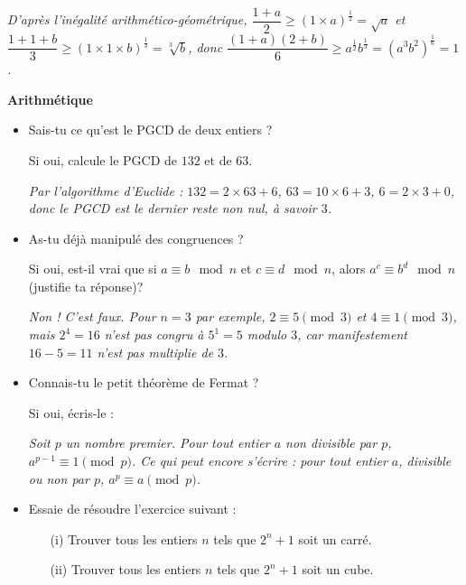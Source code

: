 \bigskip

\emph{D'après l'inégalité arithmético-géométrique, $\dfrac{1+a}{2} \geq (1 \times a)^\frac12 = \sqrt{a}$ et $\dfrac{1 + 1 + b}{3} \geq (1 \times 1 \times b)^\frac13 = \sqrt[3]{b} $, donc $\dfrac{(1+a)(2+b)}{6} \geq a^{\frac12}b^{\frac13} = \left( a^3b^2 \right) ^\frac16 = 1$.}

\bigskip



\bigskip
{\Large\textbf{Arithmétique}}
\bigskip


\begin{itemize}

\item
Sais-tu ce qu'est le PGCD de deux entiers ?  \qquad {}  \qquad {}

Si oui, calcule le PGCD de $132$ et de $63$.

\bigskip

\emph{Par l'algorithme d'Euclide : $132 = 2 \times 63 + 6$, $63 = 10 \times 6 + 3$, $6 = 2 \times 3 + 0$, donc le PGCD est le dernier reste non nul, à savoir $3$.}
\bigskip
\item
As-tu déjà manipulé des congruences ?  \qquad {}  \qquad {}

Si oui, est-il vrai que si $a \equiv b \mod n$ et $c \equiv d \mod n$, alors $a^{c} \equiv b^{d} \mod n$ (justifie ta réponse)?

\bigskip

\emph{Non ! C'est faux. Pour $n = 3$ par exemple, $2 \equiv 5 \pmod{3}$ et $4 \equiv 1 \pmod {3}$, mais $2^4 = 16$ n'est pas congru à $5^1 = 5$ modulo $3$, car manifestement $16 - 5 = 11$ n'est pas multiplie de $3$.}
\bigskip


\item Connais-tu le petit théorème de Fermat ?  \qquad {}  \qquad {}

Si oui, écris-le :

\bigskip
\emph{Soit $p$ un nombre premier. Pour tout entier $a$ non divisible par $p$, $a^{p-1} \equiv 1 \pmod{p}$. Ce qui peut encore s'écrire : pour tout entier $a$, divisible ou non par $p$, $a^p \equiv a \pmod p$.}
\bigskip
\item Essaie de résoudre l'exercice suivant :
\begin{enumerate}
\item[(i)] Trouver tous les entiers $n$ tels que $2^n+1$ soit un carré. 
\item[(ii)] Trouver tous les entiers $n$ tels que $2^n+1$ soit un cube. 
\end{enumerate}
\end{itemize}

